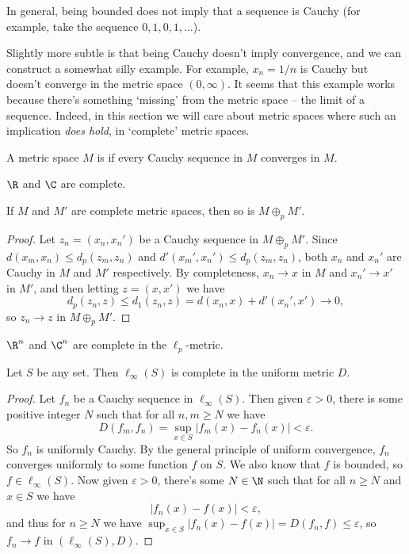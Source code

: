 In general, being bounded does not imply that a sequence is Cauchy (for example, take the sequence $0, 1, 0, 1, \dots$).

Slightly more subtle is that being Cauchy doesn't imply convergence, and we can construct a somewhat silly example. For example, $x_n = 1/n$ is Cauchy but doesn't converge in the metric space $(0, \infty)$.
It seems that this example works because there's something `missing' from the metric space -- the limit of a sequence. Indeed, in this section we will care about metric spaces where such an implication \emph{does hold}, in `complete' metric spaces.

\begin{definition}[Completeness]
    A metric space $M$ is  if every Cauchy sequence in $M$ converges in $M$.
\end{definition}

\begin{example}
    $\R$ and $\C$ are complete.
\end{example}

\begin{proposition}
    If $M$ and $M'$ are complete metric spaces, then so is $M \oplus_p M'$.
\end{proposition}
\begin{proof}
    Let $z_n = (x_n, x_n')$ be a Cauchy sequence in $M \oplus_p M'$. Since $d(x_m, x_n) \leq d_p(z_m, z_n)$ and $d'(x_m', x_n') \leq d_p(z_m, z_n)$, both $x_n$ and $x_n'$ are Cauchy in $M$ and $M'$ respectively. By completeness, $x_n \rightarrow x$ in $M$ and $x_n' \rightarrow x'$ in $M'$, and then letting $z = (x, x')$ we have
    $$
    d_p(z_n, z) \leq d_1(z_n, z) = d(x_n, x) + d'(x_n', x') \rightarrow 0,
    $$
    so $z_n \rightarrow z$ in $M \oplus_p M'$.
\end{proof}

\begin{example}
    $\R^n$ and $\C^n$ are complete in the $\ell_p$-metric.
\end{example}


\begin{theorem}
    Let $S$ be any set. Then $\ell_{\infty}(S)$ is complete in the uniform metric $D$.
\end{theorem}
\begin{proof}
    Let $f_n$ be a Cauchy sequence in $\ell_{\infty}(S)$. Then given $\varepsilon> 0$, there is some positive integer $N$ such that for all $n, m \geq N$ we have
    $$
    D(f_m, f_n) = \sup_{x \in S} |f_m(x) - f_n(x)| < \varepsilon.
    $$
    So $f_n$ is uniformly Cauchy. By the general principle of uniform convergence, $f_n$ converges uniformly to some function $f$ on $S$.
    We also know that $f$ is bounded, so $f \in \ell_{\infty}(S)$. 
    Now given $\varepsilon > 0$, there's some $N \in \N$ such that for all $n \geq N$ and $x \in S$ we have
    $$
    |f_n(x) - f(x)| < \varepsilon,
    $$
    and thus for $n \geq N$ we have $\sup_{x \in S} |f_n(x) - f(x)| = D(f_n, f) \leq \varepsilon$, so $f_n \rightarrow f$ in $(\ell_{\infty}(S), D)$.
\end{proof}

